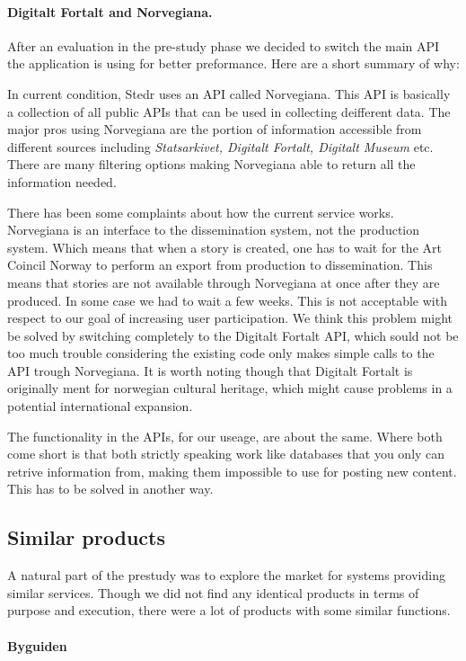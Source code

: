 \paragraph{Digitalt Fortalt and Norvegiana.}

After an evaluation in the pre-study phase we decided to switch the main API the application is using for better preformance. Here are a short summary of why:

In current condition, Stedr uses an API called Norvegiana. This API is basically a collection of all public APIs that can be used in collecting deifferent data. The major pros using Norvegiana are the portion of information accessible from different sources including \emph{Statsarkivet, Digitalt Fortalt, Digitalt Museum} etc. There are many filtering options making Norvegiana able to return all the information needed.

There has been some complaints about how the current service works. Norvegiana is an interface to the dissemination system, not the production system. Which means that when a story is created, one has to wait for the Art Coincil Norway to perform an export from production to dissemination. This means that stories are not available through Norvegiana at once after they are produced. In some case we had to wait a few weeks. This is not acceptable with respect to our goal of increasing user participation. We think this problem might be solved by switching completely to the Digitalt Fortalt API, which sould not be too much trouble considering the existing code only makes simple calls to the API trough Norvegiana. It is worth noting though that Digitalt Fortalt is originally ment for norwegian cultural heritage, which might cause problems in a potential international expansion.

The functionality in the APIs, for our useage, are about the same. Where both come short is that both strictly speaking work like databases that you only can retrive information from, making them impossible to use for posting new content. This has to be solved in another way.

	\subsection{Similar products}
		
A natural part of the prestudy was to explore the market for systems providing similar services. Though we did not find any identical products in terms of purpose and execution, there were a lot of products with some similar functions. 

\paragraph{Byguiden}

